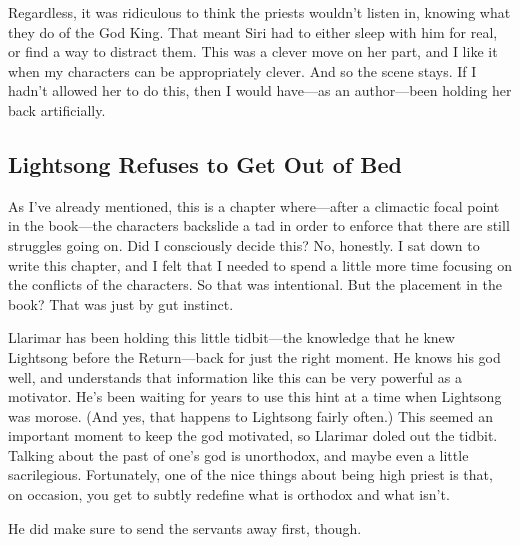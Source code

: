 Regardless, it was ridiculous to think the priests wouldn’t listen in, knowing what they do of the God King. That meant Siri had to either sleep with him for real, or find a way to distract them. This was a clever move on her part, and I like it when my characters can be appropriately clever. And so the scene stays. If I hadn’t allowed her to do this, then I would have—as an author—been holding her back artificially.

\subsection*{Lightsong Refuses to Get Out of Bed}

As I’ve already mentioned, this is a chapter where—after a climactic focal point in the book—the characters backslide a tad in order to enforce that there are still struggles going on. Did I consciously decide this? No, honestly. I sat down to write this chapter, and I felt that I needed to spend a little more time focusing on the conflicts of the characters. So that was intentional. But the placement in the book? That was just by gut instinct.

Llarimar has been holding this little tidbit—the knowledge that he knew Lightsong before the Return—back for just the right moment. He knows his god well, and understands that information like this can be very powerful as a motivator. He’s been waiting for years to use this hint at a time when Lightsong was morose. (And yes, that happens to Lightsong fairly often.) This seemed an important moment to keep the god motivated, so Llarimar doled out the tidbit. Talking about the past of one’s god is unorthodox, and maybe even a little sacrilegious. Fortunately, one of the nice things about being high priest is that, on occasion, you get to subtly redefine what is orthodox and what isn’t.

He did make sure to send the servants away first, though.




